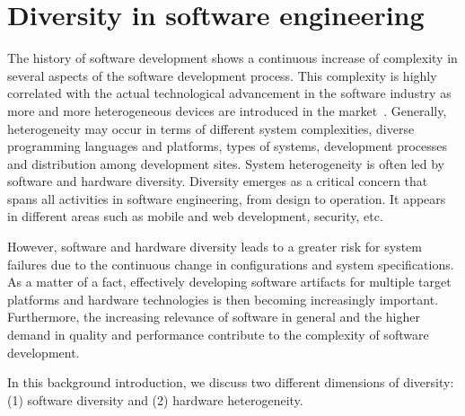 \section{Diversity in software engineering}
\label{bg:Diversity in software engineering}
The history of software development shows a continuous increase of complexity in several aspects of the software development process. This complexity is highly correlated with the actual technological advancement in the software industry as more and more heterogeneous devices are introduced in the market~\cite{betz2011improving}. 
Generally, heterogeneity may occur in terms of different system complexities, diverse programming languages and platforms, types of systems, development processes and distribution among development sites\cite{ghazi2015heterogeneous}.
System heterogeneity is often led by software and hardware diversity.
Diversity emerges as a critical concern that spans all activities in software engineering, from design to operation\cite{acher2014software}. It appears in different areas such as mobile and web development\cite{doukas2013compose}, security\cite{allier2015multitier}, etc.

However, software and hardware diversity leads to a greater risk for system failures due to the continuous change in configurations and system specifications.
As a matter of a fact, effectively developing software artifacts for multiple target platforms and hardware technologies is then becoming increasingly important.
Furthermore, the increasing relevance of software in general and the higher demand in quality and performance contribute to the complexity of software development.

In this background introduction, we discuss two different dimensions of diversity: (1) software diversity and (2) hardware heterogeneity.

 
 
